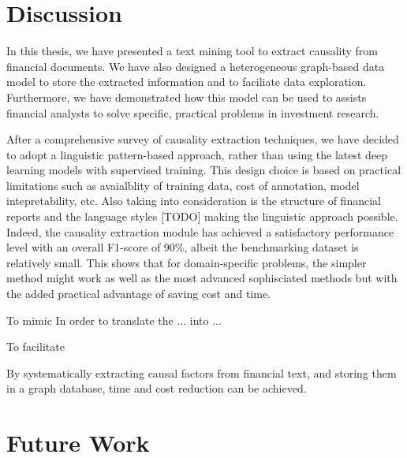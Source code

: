 

\section{Discussion}  


In this thesis, we have presented a text mining tool to extract causality from financial documents. We have also designed a heterogeneous graph-based data model to store the extracted information and to faciliate data exploration. Furthermore, we have demonstrated how this model can be used to assists financial analysts to solve specific, practical problems in investment research.

After a comprehensive survey of causality extraction techniques, we have decided to adopt a linguistic pattern-based approach, rather than using the latest deep learning models with supervised training. This design choice is based on practical limitations such as avaialblity of training data, cost of annotation, model intepretability, etc. Also taking into consideration is the structure of financial reports and the language styles [TODO] making the linguistic approach possible. Indeed, the causality extraction module has achieved a satisfactory performance level with an overall F1-score of 90\%, albeit the benchmarking dataset is relatively small. This shows that for domain-specific problems, the simpler method might work as well as the most advanced sophisciated methods but with the added practical advantage of saving cost and time.


To mimic In order to translate the ... into ... 

To facilitate 




By systematically extracting causal factors from financial text, and storing them in a graph database, time and cost reduction can be achieved. 

\section{Future Work} 
